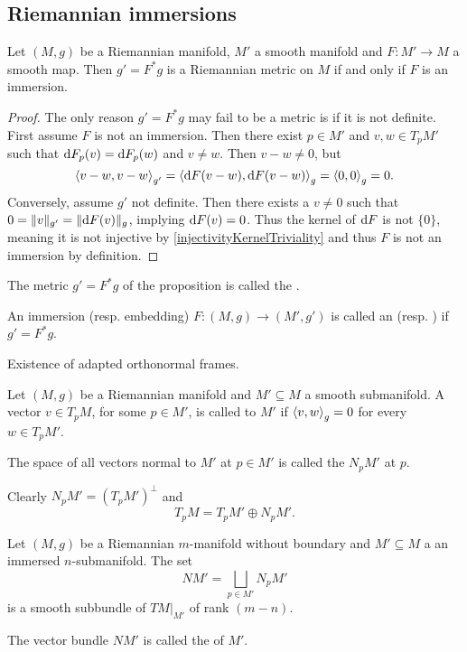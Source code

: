 \subsection{Riemannian immersions}
\begin{proposition}
Let $(M,g)$ be a Riemannian manifold, $M'$ a smooth manifold and $F:M'\to M$ a smooth map. Then $g' = F^*g$ is a Riemannian metric on $M$ \textup{if and only if} $F$ is an immersion.
\end{proposition}
\begin{proof}
The only reason $g' = F^*g$ may fail to be a metric is if it is not definite. First assume $F$ is not an immersion. Then there exist $p\in M'$ and $v,w\in T_pM'$ such that $\operatorname{d \!}{F}_p(v) = \operatorname{d \!}{F}_p(w)$ and $v\neq w$. Then $v-w \neq 0$, but
\[ \left\langle v-w,v-w \right\rangle_{g'}= \left\langle \operatorname{d \!}{F}(v-w),\operatorname{d \!}{F}(v-w) \right\rangle_{g} = \left\langle 0,0 \right\rangle_g = 0. \]
Conversely, assume $g'$ not definite. Then there exists a $v\neq 0$ such that $0 = \lVert v\rVert_{g'}= \lVert\operatorname{d \!}{F}(v)\rVert_{g}$, implying $\operatorname{d \!}{F}(v) = 0$. Thus the kernel of $\operatorname{d \!}{F}$ is not $\{0\}$, meaning it is not injective by \ref{injectivityKernelTriviality} and thus $F$ is not an immersion by definition. 
\end{proof}
The metric $g' = F^*g$ of the proposition is called the .

An immersion (resp. embedding) $F: (M,g)\to (M',g')$ is called an  (resp. ) if $g' = F^*g$.

\begin{lemma}
Existence of adapted orthonormal frames.
\end{lemma}

\begin{definition}
Let $(M,g)$ be a Riemannian manifold and $M'\subseteq M$ a smooth submanifold. A vector $v\in T_pM$, for some $p\in M'$, is called  to $M'$ if $\left\langle v,w \right\rangle_g = 0$ for every $w\in T_pM'$.

The space of all vectors normal to $M'$ at $p\in M'$ is called the  $N_pM'$ at $p$.
\end{definition}
Clearly $N_pM' = (T_pM')^\perp$ and
\[ T_pM = T_pM' \oplus N_pM'. \]

\begin{proposition}
Let $(M,g)$ be a Riemannian $m$-manifold without boundary and $M'\subseteq M$ a an immersed $n$-submanifold. The set
\[ NM' = \bigsqcup_{p\in M'}N_pM' \]
is a smooth subbundle of $TM|_{M'}$ of rank $(m-n)$.
\end{proposition}
The vector bundle $NM'$ is called the  of $M'$.

